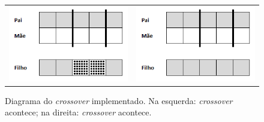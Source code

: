 	\begin{figure}[htbp]
	\centering
  \begin{tabular}{@{}cc@{}}
		\includegraphics[width=.40\textwidth]{figs/materiais_metodo/software/pai-mae-filho-com-crossover.png} &
    \includegraphics[width=.40\textwidth]{figs/materiais_metodo/software/pai-mae-filho-sem-crossover.png}
  \end{tabular}
  \caption{Diagrama do \emph{crossover} implementado. Na esquerda: \emph{crossover} acontece; na direita: \emph{crossover} acontece.}
	\label{fig:crossover_programa}
	\end{figure}

